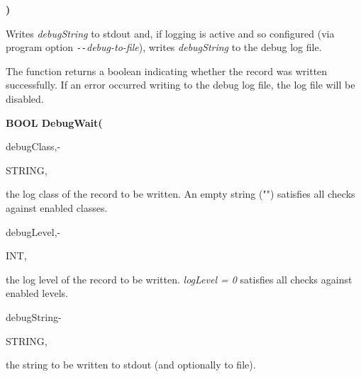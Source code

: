 \textbf{)}

\medskip 
Writes \textit{debugString} to stdout and, if logging is active and so configured (via program option \textit{\texttt{-{}-}debug-to-file}), writes \textit{debugString} to the debug log file.

The function returns a boolean indicating whether the record was written successfully. If an error occurred writing to the debug log file, the log file will be disabled.

\newpage
\textbf{BOOL DebugWait(}

\hfill
\begin{minipage}{\dimexpr\textwidth-2em}

        \medskip
        \begin{minipage}[t][][b]{9.5em}debugClass,\hfill{-}\end{minipage}
        \begin{minipage}[t][][b]{5.5em}STRING,\hfill\end{minipage}
        \begin{minipage}[t][][b]{\dimexpr\textwidth-15.5em}
            the log class of the record to be written. An empty string ("") satisfies all checks against enabled classes.
        \end{minipage}\vfill

        \medskip
        \begin{minipage}[t][][b]{9.5em}debugLevel,\hfill{-}\end{minipage}
        \begin{minipage}[t][][b]{5.5em}INT,\hfill\end{minipage}
        \begin{minipage}[t][][b]{\dimexpr\textwidth-15.5em}
            the log level of the record to be written. \textit{logLevel = 0} satisfies all checks against enabled levels.
        \end{minipage}\vfill

        \medskip
        \begin{minipage}[t][][b]{9.5em}debugString\hfill{-}\end{minipage}
        \begin{minipage}[t][][b]{5.5em}STRING,\hfill\end{minipage}
        \begin{minipage}[t][][b]{\dimexpr\textwidth-15.5em}
            the string to be written to stdout (and optionally to file).
        \end{minipage}\vfill
\end{minipage}

